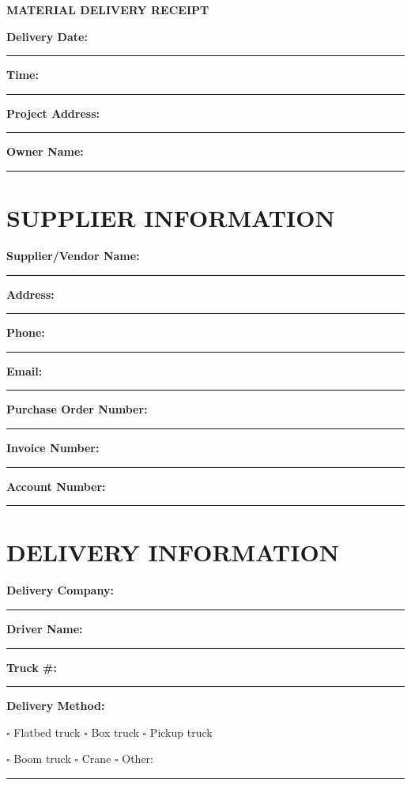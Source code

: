 \documentclass[11pt,letterpaper]{article}
\begin{document}
\begin{center}
\textbf{\Large MATERIAL DELIVERY RECEIPT}
\end{center}

\vspace{12pt}

\textbf{Delivery Date:} \rule{4cm}{0.4pt} \hspace{0.5in} \textbf{Time:} \rule{3cm}{0.4pt}

\textbf{Project Address:} \rule{9cm}{0.4pt}

\textbf{Owner Name:} \rule{9cm}{0.4pt}

\vspace{6pt}

\section*{SUPPLIER INFORMATION}

\textbf{Supplier/Vendor Name:} \rule{8cm}{0.4pt}

\textbf{Address:} \rule{10cm}{0.4pt}

\textbf{Phone:} \rule{4cm}{0.4pt} \hspace{0.3in} \textbf{Email:} \rule{5cm}{0.4pt}

\textbf{Purchase Order Number:} \rule{6cm}{0.4pt}

\textbf{Invoice Number:} \rule{6cm}{0.4pt}

\textbf{Account Number:} \rule{6cm}{0.4pt}

\vspace{6pt}

\section*{DELIVERY INFORMATION}

\textbf{Delivery Company:} \rule{8cm}{0.4pt}

\textbf{Driver Name:} \rule{7cm}{0.4pt} \hspace{0.3in} \textbf{Truck \#:} \rule{3cm}{0.4pt}

\textbf{Delivery Method:}

$\square$ Flatbed truck \hspace{0.5in} $\square$ Box truck \hspace{0.5in} $\square$ Pickup truck

$\square$ Boom truck \hspace{0.5in} $\square$ Crane \hspace{0.5in} $\square$ Other: \rule{3cm}{0.4pt}
\end{document}
